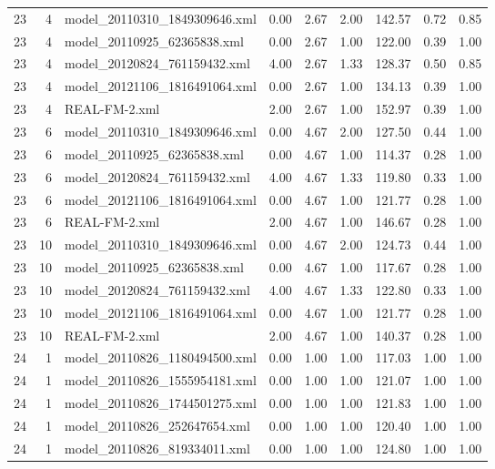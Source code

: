 \begin{table}[ht]
\begin{tabular}{rrlrrrrrr}
   23 &   4 & model\_20110310\_1849309646.xml & 0.00 & 2.67 & 2.00 & 142.57 & 0.72 & 0.85 \\ 
   23 &   4 & model\_20110925\_62365838.xml & 0.00 & 2.67 & 1.00 & 122.00 & 0.39 & 1.00 \\ 
   23 &   4 & model\_20120824\_761159432.xml & 4.00 & 2.67 & 1.33 & 128.37 & 0.50 & 0.85 \\ 
   23 &   4 & model\_20121106\_1816491064.xml & 0.00 & 2.67 & 1.00 & 134.13 & 0.39 & 1.00 \\ 
   23 &   4 & REAL-FM-2.xml & 2.00 & 2.67 & 1.00 & 152.97 & 0.39 & 1.00 \\ 
   23 &   6 & model\_20110310\_1849309646.xml & 0.00 & 4.67 & 2.00 & 127.50 & 0.44 & 1.00 \\ 
   23 &   6 & model\_20110925\_62365838.xml & 0.00 & 4.67 & 1.00 & 114.37 & 0.28 & 1.00 \\ 
   23 &   6 & model\_20120824\_761159432.xml & 4.00 & 4.67 & 1.33 & 119.80 & 0.33 & 1.00 \\ 
   23 &   6 & model\_20121106\_1816491064.xml & 0.00 & 4.67 & 1.00 & 121.77 & 0.28 & 1.00 \\ 
   23 &   6 & REAL-FM-2.xml & 2.00 & 4.67 & 1.00 & 146.67 & 0.28 & 1.00 \\ 
   23 &  10 & model\_20110310\_1849309646.xml & 0.00 & 4.67 & 2.00 & 124.73 & 0.44 & 1.00 \\ 
   23 &  10 & model\_20110925\_62365838.xml & 0.00 & 4.67 & 1.00 & 117.67 & 0.28 & 1.00 \\ 
   23 &  10 & model\_20120824\_761159432.xml & 4.00 & 4.67 & 1.33 & 122.80 & 0.33 & 1.00 \\ 
   23 &  10 & model\_20121106\_1816491064.xml & 0.00 & 4.67 & 1.00 & 121.77 & 0.28 & 1.00 \\ 
   23 &  10 & REAL-FM-2.xml & 2.00 & 4.67 & 1.00 & 140.37 & 0.28 & 1.00 \\ 
   24 &   1 & model\_20110826\_1180494500.xml & 0.00 & 1.00 & 1.00 & 117.03 & 1.00 & 1.00 \\ 
   24 &   1 & model\_20110826\_1555954181.xml & 0.00 & 1.00 & 1.00 & 121.07 & 1.00 & 1.00 \\ 
   24 &   1 & model\_20110826\_1744501275.xml & 0.00 & 1.00 & 1.00 & 121.83 & 1.00 & 1.00 \\ 
   24 &   1 & model\_20110826\_252647654.xml & 0.00 & 1.00 & 1.00 & 120.40 & 1.00 & 1.00 \\ 
   24 &   1 & model\_20110826\_819334011.xml & 0.00 & 1.00 & 1.00 & 124.80 & 1.00 & 1.00 \\ 

\end{tabular}
\end{table}
